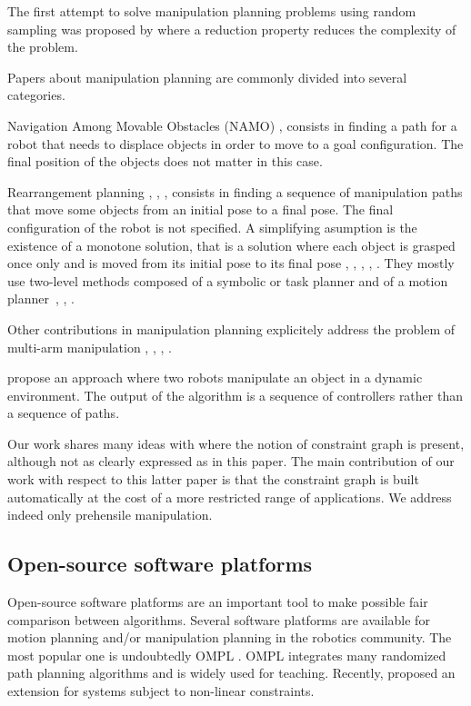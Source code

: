 The first attempt to solve manipulation planning problems using random sampling
was proposed by \cite{simeon2004ijrr} where a reduction property reduces the
complexity of the problem.

Papers about manipulation planning are commonly divided into several categories.

Navigation Among Movable Obstacles (NAMO) \cite{wilfong1988motion}, \cite{stilman2008planning} consists in finding
a path for a robot that needs to displace objects in order to move to a goal
configuration. The final position of the objects does not matter in this case.

Rearrangement planning \cite{ota2004rearrangement}, \cite{LIS210},
\cite{KroBek2015}, \cite{LerPha2015} consists in finding a sequence of
manipulation paths that move some objects from an initial pose to a
final pose. The final configuration of the robot is not specified. A
simplifying asumption is the existence of a monotone solution, that is
a solution where each object is grasped once only and is moved from
its initial pose to its final pose \cite{stilman2008planning},
\cite{stilman2007manipulation}, \cite{srivastavaetal2014icra}, \cite{nieuwenhuisen2008effective},
\cite{ota2004rearrangement}. They mostly use two-level methods
composed of a symbolic or task planner and of a motion
planner~\cite{cambon:hal-01976081}, \cite{KaeLoz2013}, \cite{18-toussaint-RSS}.

Other contributions in manipulation planning explicitely address the problem of multi-arm manipulation \cite{GhaCorSim2009}, \cite{HarTsuLau2014}, \cite{DobBek2015}, \cite{XiaLerPha2017}.

\cite{schmitt19icra} propose an approach where two robots manipulate an object in a dynamic environment. The output of the algorithm is a sequence of controllers rather than a sequence of paths.

Our work shares many ideas with \cite{HauNgt2011} where the notion of constraint
graph is present, although not as clearly expressed as in this paper. The main
contribution of our work with respect to this latter paper is that the
constraint graph is built automatically at the cost of a more restricted range
of applications. We address indeed only prehensile manipulation.

\subsection{Open-source software platforms}

Open-source software platforms are an important tool to make possible fair
comparison between algorithms.
Several software platforms are available for motion planning and/or manipulation
planning in the robotics community. The most popular one is undoubtedly OMPL \cite{ompl2012}. OMPL integrates many randomized path planning algorithms and is widely used for teaching. Recently, \cite{KinMolKav2019} proposed an extension for systems subject to non-linear constraints.

